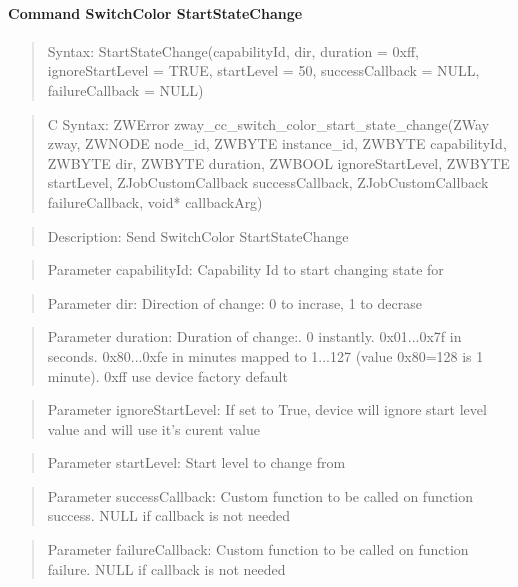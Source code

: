 \paragraph{Command SwitchColor StartStateChange}
\begin{quote}Syntax: StartStateChange(capabilityId, dir, duration = 0xff, ignoreStartLevel = TRUE, startLevel = 50, successCallback = NULL, failureCallback = NULL)\end{quote}
\begin{quote}C Syntax: ZWError zway\_cc\_switch\_color\_start\_state\_change(ZWay zway, ZWNODE node\_id, ZWBYTE instance\_id, ZWBYTE capabilityId, ZWBYTE dir, ZWBYTE duration, ZWBOOL ignoreStartLevel, ZWBYTE startLevel, ZJobCustomCallback successCallback, ZJobCustomCallback failureCallback, void* callbackArg)\end{quote}
\begin{quote}Description: Send SwitchColor StartStateChange\end{quote}
\begin{quote}Parameter capabilityId: Capability Id to start changing state for\end{quote}
\begin{quote}Parameter dir: Direction of change: 0 to incrase, 1 to decrase\end{quote}
\begin{quote}Parameter duration: Duration of change:. 0 instantly. 0x01...0x7f in seconds. 0x80...0xfe in minutes mapped to 1...127 (value 0x80=128 is 1 minute). 0xff use device factory default\end{quote}
\begin{quote}Parameter ignoreStartLevel: If set to True, device will ignore start level value and will use it's curent value\end{quote}
\begin{quote}Parameter startLevel: Start level to change from\end{quote}
\begin{quote}Parameter successCallback: Custom function to be called on function success. NULL if callback is not needed\end{quote}
\begin{quote}Parameter failureCallback: Custom function to be called on function failure. NULL if callback is not needed\end{quote}


